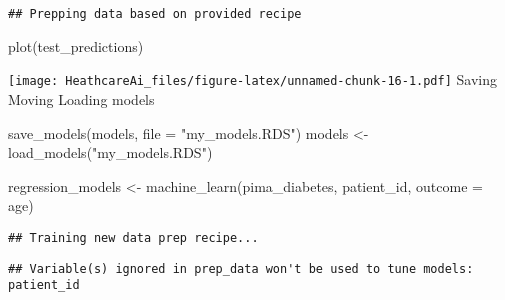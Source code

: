 \documentclass[
]{article}
\newenvironment{Shaded}{\begin{snugshade}}{\end{snugshade}}
\newcommand{\AttributeTok}[1]{\textcolor[rgb]{0.77,0.63,0.00}{#1}}
\newcommand{\DecValTok}[1]{\textcolor[rgb]{0.00,0.00,0.81}{#1}}
\newcommand{\FunctionTok}[1]{\textcolor[rgb]{0.00,0.00,0.00}{#1}}
\newcommand{\NormalTok}[1]{#1}
\newcommand{\OtherTok}[1]{\textcolor[rgb]{0.56,0.35,0.01}{#1}}
\newcommand{\SpecialCharTok}[1]{\textcolor[rgb]{0.00,0.00,0.00}{#1}}
\newcommand{\StringTok}[1]{\textcolor[rgb]{0.31,0.60,0.02}{#1}}
\begin{document}
\begin{Shaded}
\end{Shaded}

\begin{verbatim}
## Prepping data based on provided recipe
\end{verbatim}

\begin{Shaded}
\begin{Highlighting}[]
\FunctionTok{plot}\NormalTok{(test\_predictions)}
\end{Highlighting}
\end{Shaded}

\texttt{[image: HeathcareAi\_files/figure-latex/unnamed-chunk-16-1.pdf]}
Saving Moving Loading models

\begin{Shaded}
\begin{Highlighting}[]
\FunctionTok{save\_models}\NormalTok{(models, }\AttributeTok{file =} \StringTok{"my\_models.RDS"}\NormalTok{)}
\NormalTok{models }\OtherTok{\textless{}{-}} \FunctionTok{load\_models}\NormalTok{(}\StringTok{"my\_models.RDS"}\NormalTok{)}
\end{Highlighting}
\end{Shaded}

\begin{Shaded}
\begin{Highlighting}[]
\NormalTok{regression\_models }\OtherTok{\textless{}{-}} \FunctionTok{machine\_learn}\NormalTok{(pima\_diabetes, patient\_id, }\AttributeTok{outcome =}\NormalTok{ age)}
\end{Highlighting}
\end{Shaded}

\begin{verbatim}
## Training new data prep recipe...
\end{verbatim}

\begin{verbatim}
## Variable(s) ignored in prep_data won't be used to tune models: patient_id
\end{verbatim}
\end{document}
